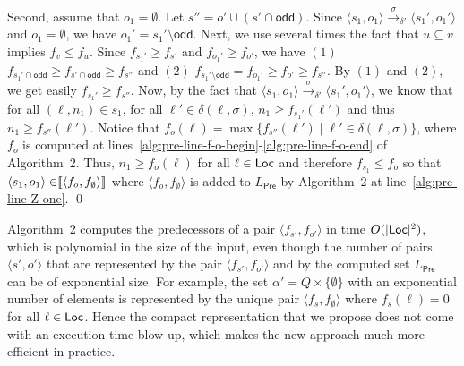 \documentclass{LMCS}
\def\sg{\mathrel[\joinrel\mathrel[}
\def\sd{\mathrel]\joinrel\mathrel]}
\def\abs#1{\ensuremath{\lvert #1\rvert}}
\newcommand{\Pre}{\mathsf{Pre}}
\newcommand{\sem}[1]{\sg \mathrel{#1} \sd}
\renewcommand{\l}{{\ell}}
\newcommand{\Loc}{{\sf Loc}}
\newcommand{\tuple}[1]{\langle #1 \rangle}
\newcommand{\odd}{\mathsf{odd}}
\begin{document}
Second, assume that $o_1 = \emptyset$. Let $s'' = o' \cup (s' \cap \odd)$. 
Since $\tuple{s_1,o_1} \xrightarrow{\sigma}_{\delta'} \tuple{s_1',o_1'}$ and $o_1 = \emptyset$,
we have $o_1' = s_1' \setminus \odd$. 
Next, we use several times the fact that $u \subseteq v$ implies $f_v \leq f_u$. 
Since $f_{s_1'} \geq f_{s'}$ and $f_{o_1'} \geq f_{o'}$, we have 
$(1)$ $f_{s_1' \cap \odd} \geq f_{s' \cap \odd} \geq f_{s''}$ 
and $(2)$ $f_{s_1' \setminus \odd} = f_{o_1'} \geq f_{o'} \geq f_{s''}$. 
By $(1)$ and $(2)$, we get easily $f_{s_1'} \geq f_{s''}$.
Now, by the fact that 
$\tuple{s_1,o_1} \xrightarrow{\sigma}_{\delta'} \tuple{s_1',o_1'}$, we know that
for all $(\l,n_1) \in s_1$, for all $\l' \in \delta(\l,\sigma)$, $n_1 \geq f_{s_1'}(\l')$ 
and thus $n_1 \geq f_{s''}(\l')$. 
Notice that $f_o(\l) = \max\{f_{s''}(\l') \mid \l' \in\delta(\l,\sigma)\}$,
where $f_o$ is computed at lines~\ref{alg:pre-line-f-o-begin}-\ref{alg:pre-line-f-o-end} of Algorithm~2. 
Thus, $n_1 \geq f_{o}(\l)$ for all $\l \in \Loc$ 
and therefore $f_{s_1} \leq f_{o}$ so that $\tuple{s_1,o_1} \in \sem{\tuple{f_o,f_{\emptyset}}}$
where $\tuple{f_o,f_{\emptyset}}$ is added to $L_{\Pre}$ by Algorithm~2 at line~\ref{alg:pre-line-Z-one}. 
\qed


Algorithm~2 computes the predecessors of a pair $\tuple{f_{s'},f_{o'}}$
in time $O(\abs{\Loc}^2)$, which is polynomial in the size of the input, even though
the number of pairs $\tuple{s',o'}$ that are represented by the pair $\tuple{f_{s'},f_{o'}}$
and by the computed set $L_{\Pre}$ can be of exponential size.
For example, the set $\alpha'= Q \times \{\emptyset\}$ 
with an exponential number of elements is represented by the unique
pair $\tuple{f_s,f_{\emptyset}}$ where $f_s(\l) = 0$ for all $\l \in \Loc$.
Hence the compact representation that we propose does not come
with an execution time blow-up, which makes the new approach much more efficient 
in practice.
\end{document}
